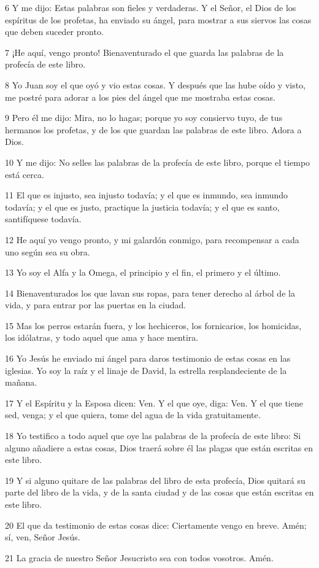 \par 6 Y me dijo: Estas palabras son fieles y verdaderas. Y el Señor, el Dios de los espíritus de los profetas, ha enviado su ángel, para mostrar a sus siervos las cosas que deben suceder pronto.
\par 7 ¡He aquí, vengo pronto! Bienaventurado el que guarda las palabras de la profecía de este libro.
\par 8 Yo Juan soy el que oyó y vio estas cosas. Y después que las hube oído y visto, me postré para adorar a los pies del ángel que me mostraba estas cosas.
\par 9 Pero él me dijo: Mira, no lo hagas; porque yo soy consiervo tuyo, de tus hermanos los profetas, y de los que guardan las palabras de este libro. Adora a Dios.
\par 10 Y me dijo: No selles las palabras de la profecía de este libro, porque el tiempo está cerca.
\par 11 El que es injusto, sea injusto todavía; y el que es inmundo, sea inmundo todavía; y el que es justo, practique la justicia todavía; y el que es santo, santifíquese todavía.
\par 12 He aquí yo vengo pronto, y mi galardón conmigo, para recompensar a cada uno según sea su obra.
\par 13 Yo soy el Alfa y la Omega, el principio y el fin, el primero y el último.
\par 14 Bienaventurados los que lavan sus ropas, para tener derecho al árbol de la vida, y para entrar por las puertas en la ciudad.
\par 15 Mas los perros estarán fuera, y los hechiceros, los fornicarios, los homicidas, los idólatras, y todo aquel que ama y hace mentira.
\par 16 Yo Jesús he enviado mi ángel para daros testimonio de estas cosas en las iglesias. Yo soy la raíz y el linaje de David, la estrella resplandeciente de la mañana.
\par 17 Y el Espíritu y la Esposa dicen: Ven. Y el que oye, diga: Ven. Y el que tiene sed, venga; y el que quiera, tome del agua de la vida gratuitamente.
\par 18 Yo testifico a todo aquel que oye las palabras de la profecía de este libro: Si alguno añadiere a estas cosas, Dios traerá sobre él las plagas que están escritas en este libro.
\par 19 Y si alguno quitare de las palabras del libro de esta profecía, Dios quitará su parte del libro de la vida, y de la santa ciudad y de las cosas que están escritas en este libro.
\par 20 El que da testimonio de estas cosas dice: Ciertamente vengo en breve. Amén; sí, ven, Señor Jesús.
\par 21 La gracia de nuestro Señor Jesucristo sea con todos vosotros. Amén.

